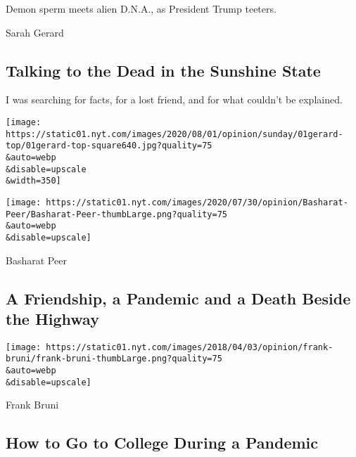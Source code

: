 Demon sperm meets alien D.N.A., as President Trump teeters.

\href{/2020/08/01/opinion/spiritualism-cassadaga-florida.html}{}

Sarah Gerard

\hypertarget{talking-to-the-dead-in-the-sunshine-state}{%
\subsection{Talking to the Dead in the Sunshine
State}\label{talking-to-the-dead-in-the-sunshine-state}}

I was searching for facts, for a lost friend, and for what couldn't be
explained.

\href{/2020/08/01/opinion/spiritualism-cassadaga-florida.html}{}

\texttt{[image: https://static01.nyt.com/images/2020/08/01/opinion/sunday/01gerard-top/01gerard-top-square640.jpg?quality=75\\\&auto=webp\\\&disable=upscale\\\&width=350]}

\href{/2020/07/31/opinion/sunday/India-migration-coronavirus.html}{}

\texttt{[image: https://static01.nyt.com/images/2020/07/30/opinion/Basharat-Peer/Basharat-Peer-thumbLarge.png?quality=75\\\&auto=webp\\\&disable=upscale]}

Basharat Peer

\hypertarget{a-friendship-a-pandemic-and-a-death-beside-the-highway}{%
\subsection{A Friendship, a Pandemic and a Death Beside the
Highway}\label{a-friendship-a-pandemic-and-a-death-beside-the-highway}}

\href{/2020/08/01/opinion/sunday/minerva-college-coronavirus.html}{}

\texttt{[image: https://static01.nyt.com/images/2018/04/03/opinion/frank-bruni/frank-bruni-thumbLarge.png?quality=75\\\&auto=webp\\\&disable=upscale]}

Frank Bruni

\hypertarget{how-to-go-to-college-during-a-pandemic}{%
\subsection{How to Go to College During a
Pandemic}\label{how-to-go-to-college-during-a-pandemic}}

\href{/2020/08/01/opinion/sunday/mail-voting-covid-2020-election.html}{}

